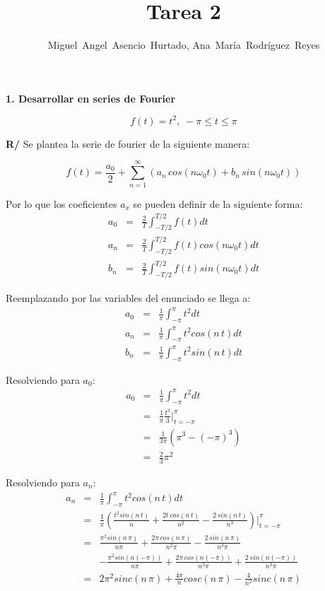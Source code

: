 \documentclass[twocolumn]{article}
\title{Tarea 2}
\author{Miguel~Angel~Asencio~Hurtado, Ana~María~Rodríguez~Reyes}
\begin{document}
\maketitle
\textbf{1. Desarrollar en series de Fourier}

$$f(t) = t^2,\; -\pi \leq t \leq \pi$$

\textbf{R/} Se plantea la serie de fourier de la siguiente manera:

$$f(t) = \frac{a_0}{2} + \sum_{n=1}^\infty\left(a_n\,cos(n\omega_0t) + b_n\,sin(n\omega_0t)\right)$$

Por lo que los coeficientes $a_x$ se pueden definir de la siguiente forma:
\begin{eqnarray*}
a_0 &=& \frac{2}{T}\int_{-T/2}^{T/2}f(t)dt\\
a_n &=& \frac{2}{T}\int_{-T/2}^{T/2}f(t)cos(n\omega_0t)dt\\
b_n &=& \frac{2}{T}\int_{-T/2}^{T/2}f(t)sin(n\omega_0t)dt
\end{eqnarray*}

Reemplazando por las variables del enunciado se llega a:
\begin{eqnarray*}
a_0 &=& \frac{1}{\pi}\int_{-\pi}^{\pi}t^2dt\\
a_n &=& \frac{1}{\pi}\int_{-\pi}^{\pi}t^2cos(n\,t)dt\\
b_n &=& \frac{1}{\pi}\int_{-\pi}^{\pi}t^2sin(n\,t)dt
\end{eqnarray*}

Resolviendo para $a_0$:
\begin{eqnarray*}
a_0 &=& \frac{1}{\pi}\int_{-\pi}^{\pi}t^2dt\\
&=& \frac{1}{\pi} \frac{t^3}{3}\bigg|_{t=-\pi}^{\pi}\\
&=& \frac{1}{3\pi} (\pi^3 - (-\pi)^3)\\
&=& \frac{2}{3}\pi^2
\end{eqnarray*}

Resolviendo para $a_n$:
\begin{eqnarray*}
a_n &=& \frac{1}{\pi}\int_{-\pi}^{\pi}t^2cos(n\,t)dt\\
&=& \frac{1}{\pi} \left(\frac{t^2sin(n\,t)}{n} + \frac{2t\,cos(n\,t)}{n^2} - \frac{2\,sin(n\,t)}{n^3}\right)\bigg|_{t=-\pi}^{\pi}\\
&=& \frac{\pi^2sin(n\,\pi)}{n\pi} + \frac{2\pi\,cos(n\,\pi)}{n^2\pi} - \frac{2\,sin(n\,\pi)}{n^3\pi}\\
& &- \frac{\pi^2sin(n(-\pi))}{n\pi} + \frac{2\pi\,cos(n(-\pi))}{n^2\pi} + \frac{2\,sin(n(-\pi))}{n^3\pi}\\
&=& 2\pi^2 sinc(n\,\pi) + \frac{4\pi}{n}cosc(n\,\pi) - \frac{4}{n^2}sinc(n\,\pi)
\end{eqnarray*}
\end{document}
